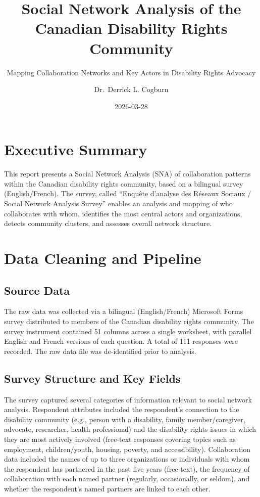 \documentclass[
  letterpaper,
  DIV=11,
  numbers=noendperiod]{scrartcl}
\title{Social Network Analysis of the Canadian Disability Rights
Community}
\subtitle{Mapping Collaboration Networks and Key Actors in Disability
Rights Advocacy}
\author{Dr.~Derrick L. Cogburn}
\date{2026-03-28}
\renewcommand*\contentsname{Table of contents}
\newcommand\contentsname{Table of contents}
\begin{document}
\maketitle

\renewcommand*\contentsname{Table of contents}
{
\hypersetup{linkcolor=}
\setcounter{tocdepth}{2}
\tableofcontents
}

\section{Executive Summary}\label{executive-summary}

This report presents a Social Network Analysis (SNA) of collaboration
patterns within the Canadian disability rights community, based on a
bilingual survey (English/French). The survey, called ``Enquête
d'analyse des Réseaux Sociaux / Social Network Analysis Survey'' enables
an analysis and mapping of who collaborates with whom, identifies the
most central actors and organizations, detects community clusters, and
assesses overall network structure.

\section{Data Cleaning and Pipeline}\label{data-cleaning-and-pipeline}

\subsection{Source Data}\label{source-data}

The raw data was collected via a bilingual (English/French) Microsoft
Forms survey distributed to members of the Canadian disability rights
community. The survey instrument contained 51 columns across a single
worksheet, with parallel English and French versions of each question. A
total of 111 responses were recorded. The raw data file was
de-identified prior to analysis.

\subsection{Survey Structure and Key
Fields}\label{survey-structure-and-key-fields}

The survey captured several categories of information relevant to social
network analysis. Respondent attributes included the respondent's
connection to the disability community (e.g., person with a disability,
family member/caregiver, advocate, researcher, health professional) and
the disability rights issues in which they are most actively involved
(free-text responses covering topics such as employment, children/youth,
housing, poverty, and accessibility). Collaboration data included the
names of up to three organizations or individuals with whom the
respondent has partnered in the past five years (free-text), the
frequency of collaboration with each named partner (regularly,
occasionally, or seldom), and whether the respondent's named partners
are linked to each other.
\end{document}
